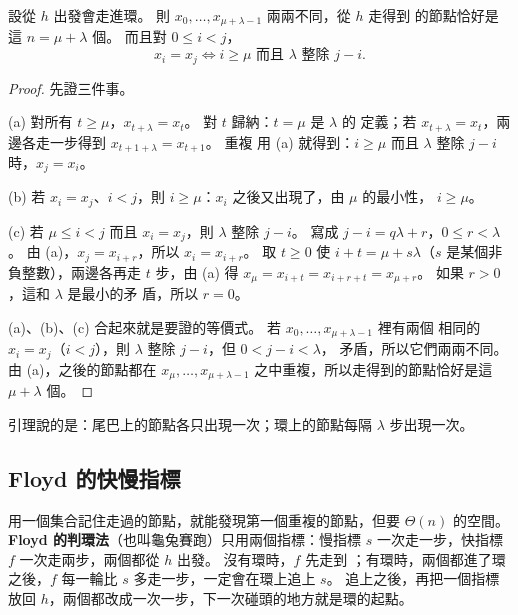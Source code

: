 \begin{lemma}
\label{lem:ll-rho}
設從 $h$ 出發會走進環。 則 $x_0, \ldots, x_{\mu+\lambda-1}$ 兩兩不同，從 $h$ 走得到
的節點恰好是這 $n = \mu + \lambda$ 個。 而且對 $0 \le i < j$，
\[
x_i = x_j \iff i \ge \mu \text{ 而且 } \lambda \text{ 整除 } j - i .
\]
\end{lemma}

\begin{proof}
先證三件事。

(a) 對所有 $t \ge \mu$，$x_{t+\lambda} = x_t$。 對 $t$ 歸納：$t = \mu$ 是 $\lambda$ 的
定義；若 $x_{t+\lambda} = x_t$，兩邊各走一步得到 $x_{t+1+\lambda} = x_{t+1}$。 重複
用 (a) 就得到：$i \ge \mu$ 而且 $\lambda$ 整除 $j - i$ 時，$x_j = x_i$。

(b) 若 $x_i = x_j$、$i < j$，則 $i \ge \mu$：$x_i$ 之後又出現了，由 $\mu$ 的最小性，
$i \ge \mu$。

(c) 若 $\mu \le i < j$ 而且 $x_i = x_j$，則 $\lambda$ 整除 $j - i$。 寫成 $j - i = q\lambda
+ r$，$0 \le r < \lambda$。 由 (a)，$x_j = x_{i+r}$，所以 $x_i = x_{i+r}$。 取 $t \ge 0$
使 $i + t = \mu + s\lambda$（$s$ 是某個非負整數），兩邊各再走 $t$ 步，由 (a) 得
$x_\mu = x_{i+t} = x_{i+r+t} = x_{\mu+r}$。 如果 $r > 0$，這和 $\lambda$ 是最小的矛
盾，所以 $r = 0$。

(a)、(b)、(c) 合起來就是要證的等價式。 若 $x_0, \ldots, x_{\mu+\lambda-1}$ 裡有兩個
相同的 $x_i = x_j$（$i < j$），則 $\lambda$ 整除 $j - i$，但 $0 < j - i < \lambda$，
矛盾，所以它們兩兩不同。 由 (a)，之後的節點都在 $x_\mu, \ldots, x_{\mu+\lambda-1}$
之中重複，所以走得到的節點恰好是這 $\mu + \lambda$ 個。
\end{proof}

引理說的是：尾巴上的節點各只出現一次；環上的節點每隔 $\lambda$ 步出現一次。

\subsection{Floyd 的快慢指標}

用一個集合記住走過的節點，就能發現第一個重複的節點，但要 $\Theta(n)$ 的空間。
\textbf{Floyd 的判環法}（也叫龜兔賽跑）只用兩個指標：慢指標 $s$ 一次走一步，快指標
$f$ 一次走兩步，兩個都從 $h$ 出發。 沒有環時，$f$ 先走到 \NIL；有環時，兩個都進了環
之後，$f$ 每一輪比 $s$ 多走一步，一定會在環上追上 $s$。 追上之後，再把一個指標放回
$h$，兩個都改成一次一步，下一次碰頭的地方就是環的起點。

